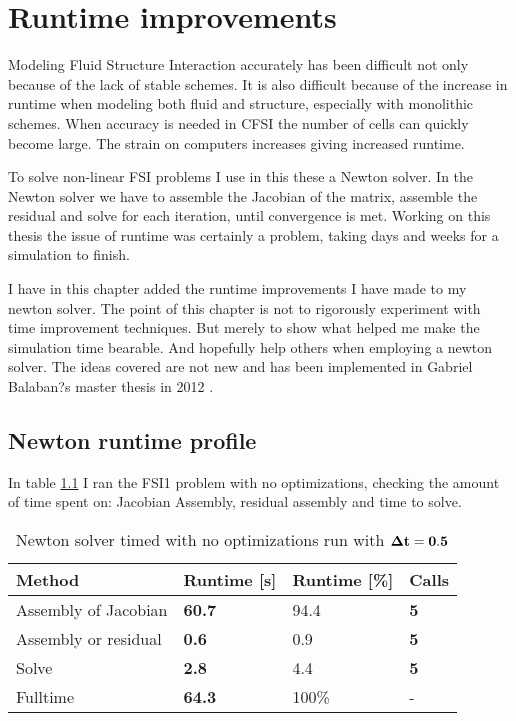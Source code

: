 \chapter{Runtime improvements}
Modeling Fluid Structure Interaction accurately has been difficult not only because of the lack of stable schemes. It is also difficult because of the increase in runtime when modeling both fluid and structure, especially with monolithic schemes. When accuracy is needed in CFSI the number of cells can quickly become large. The strain on computers increases giving increased runtime. 

To solve non-linear FSI problems I use in this these a Newton solver. In the Newton solver we have to assemble the Jacobian of the matrix, assemble the residual and solve for each iteration, until convergence is met. Working on this thesis the issue of runtime was certainly a problem, taking days and weeks for a simulation to finish. 

I have in this chapter added the runtime improvements I have made to my newton solver. The point of this chapter is not to rigorously experiment with time improvement techniques. But merely to show what helped me make the simulation time bearable. And hopefully help others when employing a newton solver. The ideas covered are not new and has been implemented in Gabriel Balaban?s master thesis in 2012 \cite{Sciences2012}.

\section{Newton runtime profile}
In table \ref{no_opt} I ran the FSI1 problem with no optimizations, checking the amount of time spent on: Jacobian Assembly, residual assembly and time to solve. 

\begin{table}[H]
\centering
\caption{Newton solver timed with no optimizations run with $\bold{\Delta t = 0.5}$ }
\label{no_opt}
\begin{tabular}{|l|l|l|l|}
\hline
Method               & \textbf{Runtime {{[}}s{{]}}} & Runtime {{[}}\%{{]}} & \textbf{Calls} \\ \hline
Assembly of Jacobian & \textbf{60.7}                    & 94.4                     & \textbf{5}     \\ \hline
Assembly or residual & \textbf{0.6}                     & 0.9                      & \textbf{5}     \\ \hline
Solve                & \textbf{2.8}                     & 4.4                      & \textbf{5}     \\ \hline
Fulltime             & \textbf{64.3}                    & 100\%                    & -                \\ \hline
\end{tabular}
\end{table}

